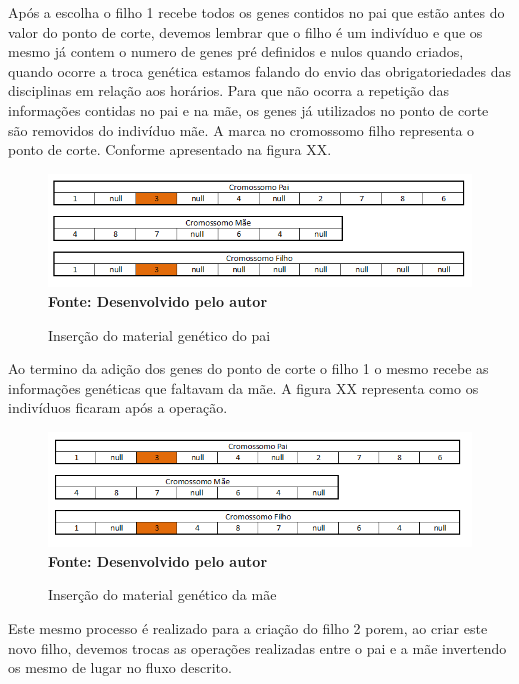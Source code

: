 Após a escolha o filho 1 recebe todos os genes contidos no pai que estão antes do valor do ponto de corte, devemos lembrar que o filho é um indivíduo e que os mesmo já contem o numero de genes pré definidos e nulos quando criados, quando ocorre a troca genética estamos falando do envio das obrigatoriedades das disciplinas em relação aos horários. Para que não ocorra a repetição das informações contidas no pai e na mãe, os genes já utilizados no ponto de corte são removidos do indivíduo mãe. A marca no cromossomo filho representa o ponto de corte. Conforme apresentado na figura XX.

\begin{figure}[!htb]
\caption[Inserção do material genético do pai]{Inserção do material genético do pai}
\label{fig:figura8}
\centering
\includegraphics[scale=0.6]{imagens/individuosAposInsersaoGenetica.png}
\\ \textbf{\footnotesize Fonte: Desenvolvido pelo autor}
\end{figure}

Ao termino da adição dos genes do ponto de corte o filho 1 o mesmo recebe as informações genéticas que faltavam da mãe. A figura XX representa como os indivíduos ficaram após a operação.

\begin{figure}[!htb]
\caption[Inserção do material genético da mãe]{Inserção do material genético da mãe}
\label{fig:figura8}
\centering
\includegraphics[scale=0.7]{imagens/insersaoMaterialMae.png}
\\ \textbf{\footnotesize Fonte: Desenvolvido pelo autor}
\end{figure}

Este mesmo processo é realizado para a criação do filho 2 porem, ao criar este novo filho, devemos trocas as operações realizadas entre o pai e a mãe invertendo os mesmo de lugar no fluxo descrito.


